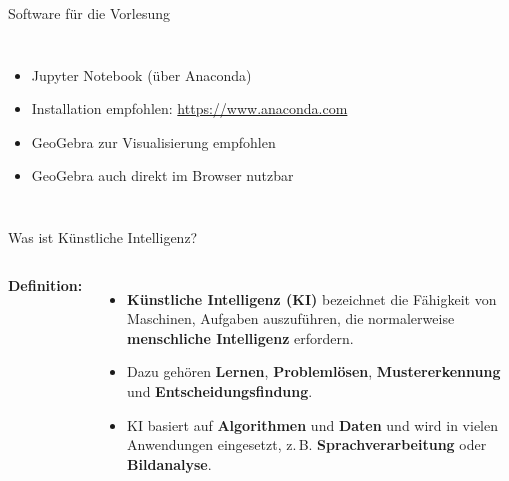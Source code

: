 

\begin{frame}{Software für die Vorlesung}
\begin{columns}
\begin{itemize}
\item Jupyter Notebook (über Anaconda)
\item Installation empfohlen: \url{https://www.anaconda.com}
\item GeoGebra zur Visualisierung empfohlen
\item GeoGebra auch direkt im Browser nutzbar
\end{itemize}

\medskip

\begin{center}
\\
\vspace{0.5cm}

\end{center}
\end{columns}

\end{frame}





\begin{frame}{Was ist Künstliche Intelligenz?}
\begin{columns}
\textbf{Definition:}
\begin{itemize}
\item \textbf{Künstliche Intelligenz (KI)} bezeichnet die Fähigkeit von Maschinen, Aufgaben auszuführen, die normalerweise \textbf{menschliche Intelligenz} erfordern.
\item Dazu gehören \textbf{Lernen}, \textbf{Problemlösen}, \textbf{Mustererkennung} und \textbf{Entscheidungsfindung}.
\item KI basiert auf \textbf{Algorithmen} und \textbf{Daten} und wird in vielen Anwendungen eingesetzt, z.\,B. \textbf{Sprachverarbeitung} oder \textbf{Bildanalyse}.
\end{itemize}

\centering
{}

\end{columns}
\end{frame}

